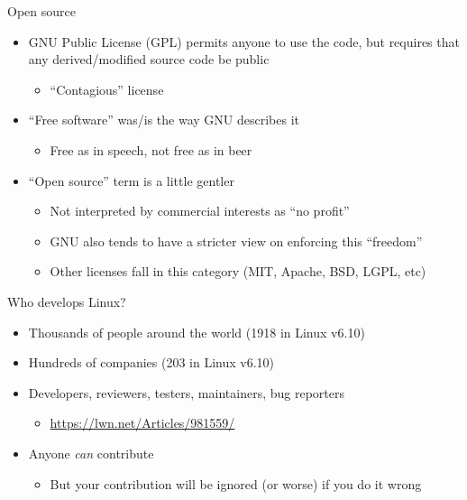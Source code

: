 \documentclass[aspectratio=169, notes]{beamer}
\begin{document}
\begin{frame}{Open source}
	\begin{itemize}
	\item GNU Public License (GPL) permits anyone to use the code, but requires that any derived/modified source code be public
		\begin{itemize}
		\item ``Contagious'' license
		\end{itemize}
	\item ``Free software'' was/is the way GNU describes it
		\begin{itemize}
		\item Free as in speech, not free as in beer
		\end{itemize}
	\item ``Open source'' term is a little gentler
		\begin{itemize}
		\item Not interpreted by commercial interests as ``no profit''
		\item GNU also tends to have a stricter view on enforcing this ``freedom''
		\item Other licenses fall in this category (MIT, Apache, BSD, LGPL, etc)
		\end{itemize}
	\end{itemize}
\end{frame}

\begin{frame}{Who develops Linux?}
	\begin{itemize}
	\item Thousands of people around the world (1918 in Linux v6.10)
	\item Hundreds of companies (203 in Linux v6.10)
	\item Developers, reviewers, testers, maintainers, bug reporters
		\begin{itemize}
		\item \url{https://lwn.net/Articles/981559/}
		\end{itemize}
	\item Anyone \emph{can} contribute
		\begin{itemize}
		\item But your contribution will be ignored (or worse) if you do it wrong
		\end{itemize}
	\end{itemize}
\end{frame}
\end{document}
